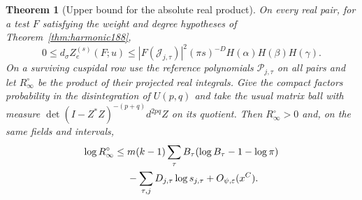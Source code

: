 \documentclass[a4paper,11pt]{article}
\newtheorem{theorem}[proposition]{Theorem}
\theoremstyle{definition}
\theoremstyle{remark}
\numberwithin{equation}{section}
\begin{document}
\begin{theorem}[Upper bound for the absolute real product]
\label{thm:abs190}
On every real pair, for a test \(F\) satisfying the weight and
degree hypotheses of Theorem~\ref{thm:harmonic188},
\[
 0\le d_\sigma Z_e^{(s)}(F;u)\le
 |F(\mathcal J_{j,\tau})|^2(\pi s)^{-D}
                      H(\alpha)H(\beta)H(\gamma).
\]
On a surviving cuspidal row use the reference polynomials
\(\mathcal P_{j,\tau}\) on all pairs and let \(R_\infty^\circ\)
be the product of their projected real integrals. Give the
compact factors probability in the disintegration of \(U(p,q)\)
and take the usual matrix ball with measure
\(\det(I-Z^*Z)^{-(p+q)}d^{2pq}Z\) on its quotient. Then
\(R_\infty^\circ>0\) and, on the same fields and intervals,
\begin{align*}
 \log R_\infty^\circ \le {}&
     m(k-1)\sum_\tau B_\tau(\log B_\tau-1-\log\pi)\\
 &-\sum_{\tau,j} D_{j,\tau}\log s_{j,\tau}
                       +O_{\psi,\varepsilon}(x^C).
\end{align*}
\end{theorem}
\end{document}
